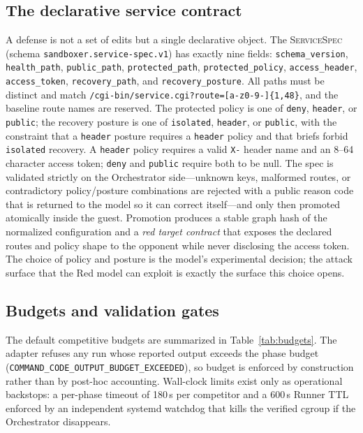\documentclass[11pt]{article}
\begin{document}
\subsection{The declarative service contract}

A defense is not a set of edits but a single declarative object. The
\textsc{ServiceSpec} (schema \texttt{sandboxer.service-spec.v1}) has exactly
nine fields: \texttt{schema\_version}, \texttt{health\_path},
\texttt{public\_path}, \texttt{protected\_path}, \texttt{protected\_policy},
\texttt{access\_header}, \texttt{access\_token}, \texttt{recovery\_path}, and
\texttt{recovery\_posture}. All paths must be distinct and match
\texttt{/cgi-bin/service.cgi?route=[a-z0-9-]\{1,48\}}, and the baseline route
names are reserved. The protected policy is one of \texttt{deny},
\texttt{header}, or \texttt{public}; the recovery posture is one of
\texttt{isolated}, \texttt{header}, or \texttt{public}, with the constraint
that a \texttt{header} posture requires a \texttt{header} policy and that
briefs forbid \texttt{isolated} recovery. A \texttt{header} policy requires a
valid \texttt{X-} header name and an 8--64 character access token; \texttt{deny}
and \texttt{public} require both to be null. The spec is validated strictly on
the Orchestrator side---unknown keys, malformed routes, or contradictory
policy/posture combinations are rejected with a public reason code that is
returned to the model so it can correct itself---and only then promoted
atomically inside the guest. Promotion produces a stable graph hash of the
normalized configuration and a \emph{red target contract} that exposes the
declared routes and policy shape to the opponent while never disclosing the
access token. The choice of policy and posture is the model's experimental
decision; the attack surface that the Red model can exploit is exactly the
surface this choice opens.

\subsection{Budgets and validation gates}

The default competitive budgets are summarized in
Table~\ref{tab:budgets}. The adapter refuses any run whose reported output
exceeds the phase budget (\texttt{COMMAND\_CODE\_OUTPUT\_BUDGET\_EXCEEDED}), so
budget is enforced by construction rather than by post-hoc
accounting. Wall-clock limits exist only as operational backstops: a
per-phase timeout of 180\,s per competitor and a 600\,s Runner TTL enforced by
an independent systemd watchdog that kills the verified cgroup if the
Orchestrator disappears.
\end{document}
